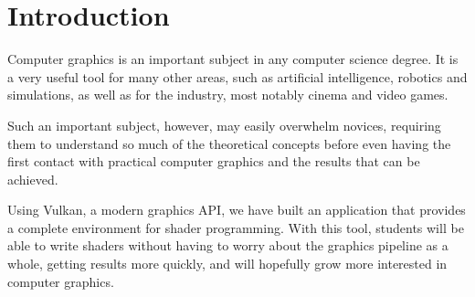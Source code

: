 \chapter{Introduction}
Computer graphics is an important subject in any computer science degree. It is a very useful tool for many other areas, such as artificial intelligence, robotics and simulations, as well as for the industry, most notably cinema and video games.

Such an important subject, however, may easily overwhelm novices, requiring them to understand so much of the theoretical concepts before even having the first contact with practical computer graphics and the results that can be achieved.

Using Vulkan, a modern graphics API, we have built an application that provides a complete environment for shader programming. With this tool, students will be able to write shaders without having to worry about the graphics pipeline as a whole, getting results more quickly, and will hopefully grow more interested in computer graphics.


